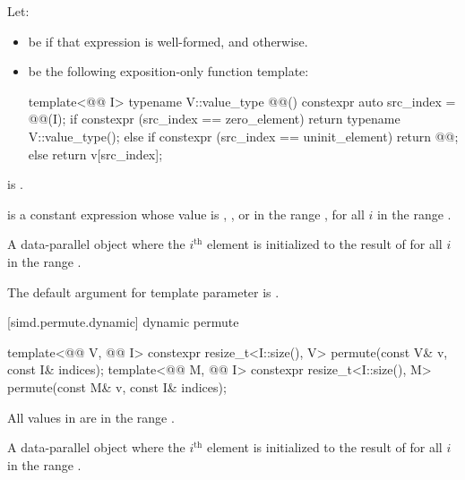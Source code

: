 \begin{itemdescr}
\pnum
Let:
\begin{itemize}
\item
{} be 
if that expression is well-formed, and  otherwise.
\item
{} be the following exposition-only function template:
\begin{codeblock}
template<@@ I>
typename V::value_type @@() {
  constexpr auto src_index = @@(I);
  if constexpr (src_index == zero_element) {
    return typename V::value_type();
  } else if constexpr (src_index == uninit_element) {
    return @@;
  } else {
    return v[src_index];
  }
}
\end{codeblock}
\end{itemize}

\pnum
\constraints
{} is .

\pnum
\mandates
{} is a constant expression whose value is
, , or in the range
, for all $i$ in the range .

\pnum
\returns
A data-parallel object where the
$i^\text{th}$ element is initialized to the result of
 for all $i$ in the range .

\pnum
\remarks
The default argument for template parameter  is .
\end{itemdescr}

[simd.permute.dynamic]{ dynamic permute}

\begin{itemdecl}
template<@@ V, @@ I>
  constexpr resize_t<I::size(), V> permute(const V& v, const I& indices);
template<@@ M, @@ I>
  constexpr resize_t<I::size(), M> permute(const M& v, const I& indices);
\end{itemdecl}

\begin{itemdescr}
\pnum
\expects
All values in  are in the range .

\pnum
\returns
A data-parallel object where the $i^\text{th}$
element is initialized to the result of  for all $i$ in
the range .
\end{itemdescr}

